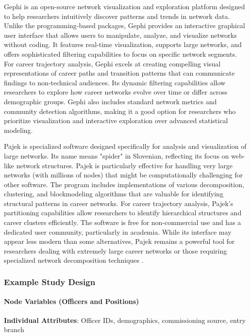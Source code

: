 \documentclass[../main.tex]{subfiles}
\begin{document}

Gephi is an open-source network visualization and exploration platform designed to help researchers intuitively discover patterns and trends in network data. Unlike the programming-based packages, Gephi provides an interactive graphical user interface that allows users to manipulate, analyze, and visualize networks without coding. It features real-time visualization, supports large networks, and offers sophisticated filtering capabilities to focus on specific network segments. For career trajectory analysis, Gephi excels at creating compelling visual representations of career paths and transition patterns that can communicate findings to non-technical audiences. Its dynamic filtering capabilities allow researchers to explore how career networks evolve over time or differ across demographic groups. Gephi also includes standard network metrics and community detection algorithms, making it a good option for researchers who prioritize visualization and interactive exploration over advanced statistical modeling.


Pajek is specialized software designed specifically for analysis and visualization of large networks. Its name means "spider" in Slovenian, reflecting its focus on web-like network structures. Pajek is particularly effective for handling very large networks (with millions of nodes) that might be computationally challenging for other software. The program includes implementations of various decomposition, clustering, and blockmodeling algorithms that are valuable for identifying structural patterns in career networks. For career trajectory analysis, Pajek's partitioning capabilities allow researchers to identify hierarchical structures and career clusters efficiently. The software is free for non-commercial use and has a dedicated user community, particularly in academia. While its interface may appear less modern than some alternatives, Pajek remains a powerful tool for researchers dealing with extremely large career networks or those requiring specialized network decomposition techniques \citep{butts_methodological_2008}.

\subsubsection{Example Study Design}


\paragraph{Node Variables (Officers and Positions)}
\textbf{Individual Attributes}: Officer IDs, demographics, commissioning source, entry branch
\end{document}
